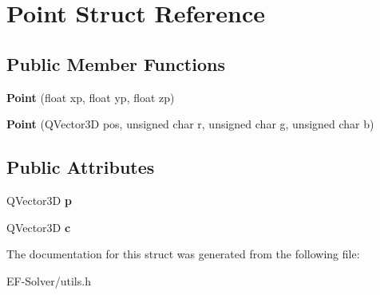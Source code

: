 \hypertarget{struct_point}{}\section{Point Struct Reference}
\label{struct_point}
\subsection*{Public Member Functions}
\begin{DoxyCompactItemize}
\item 
{\bfseries Point} (float xp, float yp, float zp)\hypertarget{struct_point_a6e8f421360411c1c9d8d87a05a1f22d2}{}\label{struct_point_a6e8f421360411c1c9d8d87a05a1f22d2}

\item 
{\bfseries Point} (Q\+Vector3D pos, unsigned char r, unsigned char g, unsigned char b)\hypertarget{struct_point_adfb353e445b1d93e028e9c2d597f171d}{}\label{struct_point_adfb353e445b1d93e028e9c2d597f171d}

\end{DoxyCompactItemize}
\subsection*{Public Attributes}
\begin{DoxyCompactItemize}
\item 
Q\+Vector3D {\bfseries p}\hypertarget{struct_point_a9facf974a0d7e0c9ce3c642b8d72f247}{}\label{struct_point_a9facf974a0d7e0c9ce3c642b8d72f247}

\item 
Q\+Vector3D {\bfseries c}\hypertarget{struct_point_a61448de152eaac57b2eae5873fd9bf6e}{}\label{struct_point_a61448de152eaac57b2eae5873fd9bf6e}

\end{DoxyCompactItemize}


The documentation for this struct was generated from the following file\+:\begin{DoxyCompactItemize}
\item 
E\+F-\/\+Solver/utils.\+h\end{DoxyCompactItemize}
